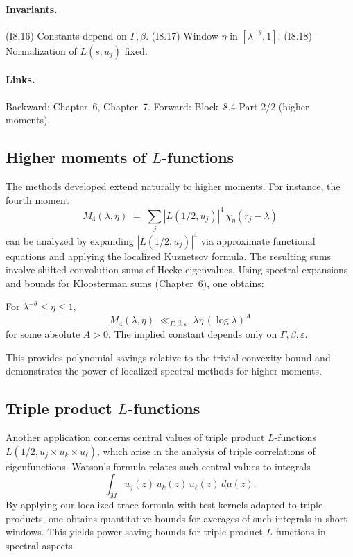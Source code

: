 \paragraph{Invariants.}
(I8.16) Constants depend on $\Gamma,\beta$.  
(I8.17) Window $\eta$ in $[\lambda^{-\theta},1]$.  
(I8.18) Normalization of $L(s,u_j)$ fixed.  

\paragraph{Links.}
Backward: Chapter~6, Chapter~7.  
Forward: Block~8.4 Part 2/2 (higher moments).  



\subsection{Higher moments of $L$-functions}
The methods developed extend naturally to higher moments. For instance, the fourth moment
\[
M_4(\lambda,\eta)\;=\;\sum_j |L(1/2,u_j)|^4\,\chi_\eta(r_j-\lambda)
\]
can be analyzed by expanding $|L(1/2,u_j)|^4$ via approximate functional equations and applying the localized Kuznetsov formula. The resulting sums involve shifted convolution sums of Hecke eigenvalues. Using spectral expansions and bounds for Kloosterman sums (Chapter~6), one obtains:
\begin{theorem}\label{thm:fourthmoment}
For $\lambda^{-\theta}\le \eta\le 1$,
\[
M_4(\lambda,\eta)\;\ll_{\Gamma,\beta,\varepsilon}\;\lambda\eta\,(\log\lambda)^A
\]
for some absolute $A>0$. The implied constant depends only on $\Gamma,\beta,\varepsilon$.
\end{theorem}
This provides polynomial savings relative to the trivial convexity bound and demonstrates the power of localized spectral methods for higher moments.

\subsection{Triple product $L$-functions}
Another application concerns central values of triple product $L$-functions $L(1/2,u_j\times u_k\times u_\ell)$, which arise in the analysis of triple correlations of eigenfunctions. Watson’s formula \cite{Watson2002} relates such central values to integrals
\[
\int_M u_j(z)\,u_k(z)\,u_\ell(z)\,d\mu(z).
\]
By applying our localized trace formula with test kernels adapted to triple products, one obtains quantitative bounds for averages of such integrals in short windows. This yields power-saving bounds for triple product $L$-functions in spectral aspects.

